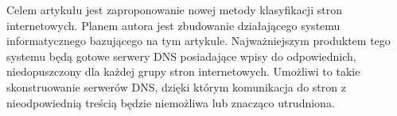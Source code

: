 \documentclass[9pt,twoside,a4paper]{article}
\begin{document}
Celem artykułu jest zaproponowanie nowej metody klasyfikacji stron internetowych. Planem autora jest zbudowanie działającego systemu informatycznego bazującego na tym artykule. Najważniejszym produktem tego systemu będą gotowe serwery DNS posiadające wpisy do odpowiednich, niedopuszczony dla każdej grupy stron internetowych. Umożliwi to takie skonstruowanie serwerów DNS, dzięki którym komunikacja do stron z nieodpowiednią treścią będzie niemożliwa lub znacząco utrudniona.







\end{document}
